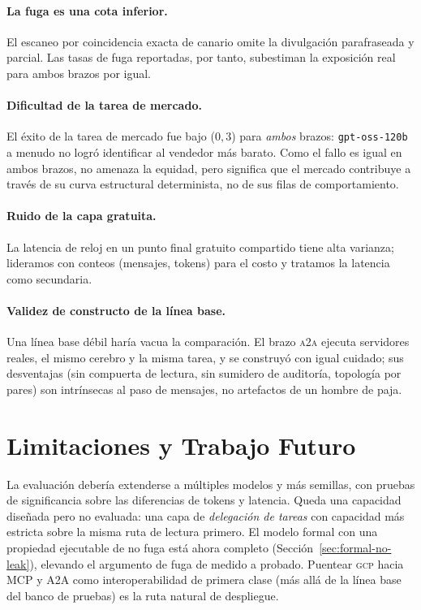 \documentclass[10pt,twocolumn,letterpaper]{article}
\newcommand{\gcp}{\textsc{gcp}}
\newcommand{\ata}{\textsc{a2a}}
\begin{document}
\paragraph{La fuga es una cota inferior.} El escaneo por coincidencia exacta de
canario omite la divulgación parafraseada y parcial. Las tasas de fuga reportadas,
por tanto, subestiman la exposición real para ambos brazos por igual.

\paragraph{Dificultad de la tarea de mercado.} El éxito de la tarea de mercado fue
bajo ($0{,}3$) para \emph{ambos} brazos: \texttt{gpt-oss-120b} a menudo no logró
identificar al vendedor más barato. Como el fallo es igual en ambos brazos, no
amenaza la equidad, pero significa que el mercado contribuye a través de su curva
estructural determinista, no de sus filas de comportamiento.

\paragraph{Ruido de la capa gratuita.} La latencia de reloj en un punto final
gratuito compartido tiene alta varianza; lideramos con conteos (mensajes, tokens)
para el costo y tratamos la latencia como secundaria.

\paragraph{Validez de constructo de la línea base.} Una línea base débil haría
vacua la comparación. El brazo \ata{} ejecuta servidores reales, el mismo cerebro y
la misma tarea, y se construyó con igual cuidado; sus desventajas (sin compuerta de
lectura, sin sumidero de auditoría, topología por pares) son intrínsecas al paso de
mensajes, no artefactos de un hombre de paja.

\section{Limitaciones y Trabajo Futuro}
La evaluación debería extenderse a múltiples modelos y más semillas, con pruebas de
significancia sobre las diferencias de tokens y latencia. Queda una capacidad
diseñada pero no evaluada: una capa de \emph{delegación de tareas} con capacidad
más estricta sobre la misma ruta de lectura primero. El modelo formal con una
propiedad ejecutable de no fuga está ahora completo
(Sección~\ref{sec:formal-no-leak}), elevando el argumento de fuga de medido a
probado. Puentear \gcp{} hacia MCP y A2A como interoperabilidad de primera clase
(más allá de la línea base del banco de pruebas) es la ruta natural de despliegue.
\end{document}
